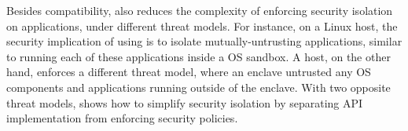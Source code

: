 Besides compatibility, \graphene{} also
reduces the complexity of enforcing security isolation on applications,
under different threat models.
For instance, on a Linux host, the security implication of using \graphene{} is to isolate mutually-untrusting applications,
similar to running each of these applications inside a OS sandbox.
A \sgx{} host, on the other hand, enforces a different threat model,
where an enclave untrusted any OS components and applications running
outside of the enclave.
With two opposite threat models,
\graphene{} shows how to simplify security isolation
by separating API implementation from enforcing security policies.







